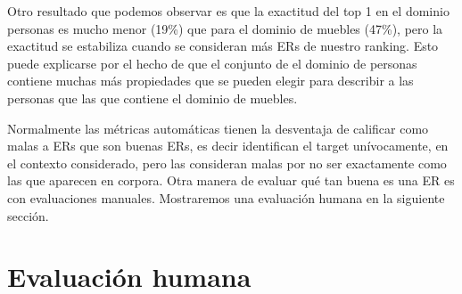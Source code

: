 \begin{table}[H]
Otro resultado que podemos observar es que la exactitud  del top 1 en el dominio personas es mucho menor (19\%) que para el dominio de muebles (47\%), pero la exactitud se estabiliza cuando se consideran m\'as ERs de nuestro ranking. Esto puede explicarse por el hecho de que el conjunto de el dominio de personas contiene muchas m\'as propiedades que se pueden elegir para describir a las personas que las que contiene el dominio de muebles.

Normalmente las m\'etricas autom\'aticas tienen la desventaja de calificar como malas a ERs que son buenas ERs, es decir identifican el target un\'ivocamente, en el contexto considerado, pero las consideran malas por no ser exactamente como las que aparecen en corpora. Otra manera de evaluar qu\'e tan buena es una ER es con evaluaciones manuales. Mostraremos una evaluaci\'on humana en la siguiente secci\'on.

 

\section{Evaluaci\'on humana} \label{sec:humanevaluation}






\end{table}
